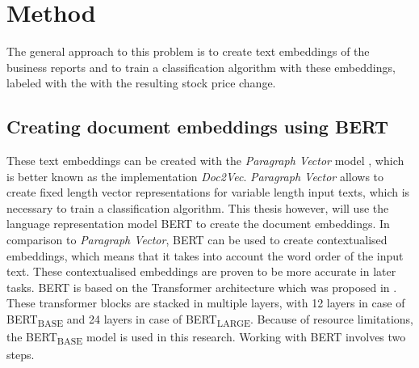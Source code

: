 \chapter{Method}\label{ch:method}

The general approach to this problem is to create text embeddings of the business reports and to train a classification algorithm with these embeddings, labeled with the with the resulting stock price change.

\section{Creating document embeddings using BERT}
These text embeddings can be created with the \textit{Paragraph Vector} model \cite{Mikolov2014}, which is better known as the implementation \textit{Doc2Vec}.
\textit{Paragraph Vector} allows to create fixed length vector representations for variable length input texts, which is necessary to train a classification algorithm.
This thesis however, will use the language representation model \ac{BERT} to create the document embeddings.
In comparison to \textit{Paragraph Vector}, \ac{BERT} can be used to create contextualised embeddings, which means that it takes into account the word order of the input text.
These contextualised embeddings are proven to be more accurate in later tasks. \cite{Joshi2019}
\ac{BERT} is based on the Transformer architecture which was proposed in \cite{Vaswani2017}.
These transformer blocks are stacked in multiple layers, with 12 layers in case of BERT\textsubscript{BASE} and 24 layers in case of BERT\textsubscript{LARGE}. \cite[p. 3]{Devlin2018}
Because of resource limitations, the BERT\textsubscript{BASE} model is used in this research.
Working with \ac{BERT} involves two steps.

